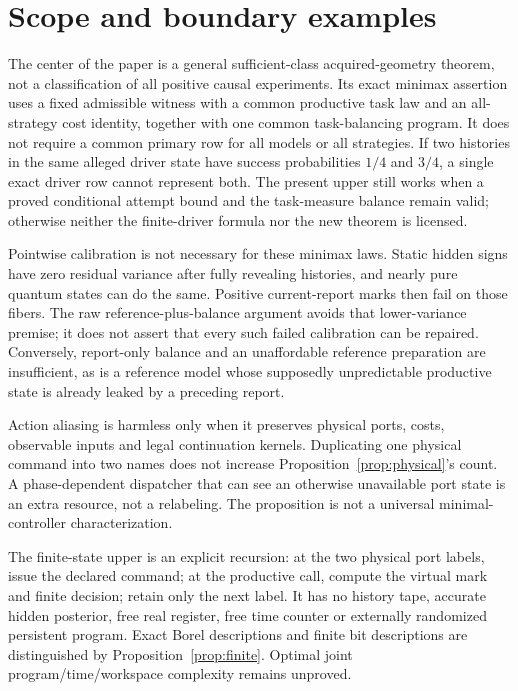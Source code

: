 \section{Scope and boundary examples}
\label{sec:scope}
The center of the paper is a general sufficient-class acquired-geometry theorem, not a classification of all positive causal experiments. Its exact minimax assertion uses a fixed admissible witness with a common productive task law and an all-strategy cost identity, together with one common task-balancing program. It does not require a common primary row for all models or all strategies. If two histories in the same alleged driver state have success probabilities $1/4$ and $3/4$, a single exact driver row cannot represent both. The present upper still works when a proved conditional attempt bound and the task-measure balance remain valid; otherwise neither the finite-driver formula nor the new theorem is licensed.

Pointwise calibration is not necessary for these minimax laws. Static hidden signs have zero residual variance after fully revealing histories, and nearly pure quantum states can do the same. Positive current-report marks then fail on those fibers. The raw reference-plus-balance argument avoids that lower-variance premise; it does not assert that every such failed calibration can be repaired. Conversely, report-only balance and an unaffordable reference preparation are insufficient, as is a reference model whose supposedly unpredictable productive state is already leaked by a preceding report.

Action aliasing is harmless only when it preserves physical ports, costs, observable inputs and legal continuation kernels. Duplicating one physical command into two names does not increase Proposition~\ref{prop:physical}'s count. A phase-dependent dispatcher that can see an otherwise unavailable port state is an extra resource, not a relabeling. The proposition is not a universal minimal-controller characterization.

The finite-state upper is an explicit recursion: at the two physical port labels, issue the declared command; at the productive call, compute the virtual mark and finite decision; retain only the next label. It has no history tape, accurate hidden posterior, free real register, free time counter or externally randomized persistent program. Exact Borel descriptions and finite bit descriptions are distinguished by Proposition~\ref{prop:finite}. Optimal joint program/time/workspace complexity remains unproved.

